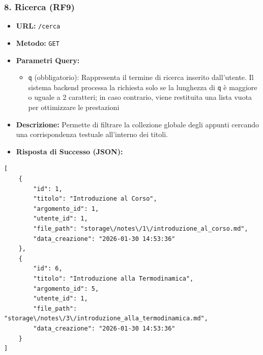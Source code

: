 \subsubsection{8. Ricerca (RF9)}
\begin{itemize}
    \item \textbf{URL:} \texttt{/cerca}
    \item \textbf{Metodo:} \texttt{GET}
    \item \textbf{Parametri Query:} 
        \begin{itemize}
            \item \texttt{q} (obbligatorio): Rappresenta il termine di ricerca inserito dall'utente. Il sistema backend processa la richiesta solo se la lunghezza di \texttt{q} è maggiore o uguale a 2 caratteri; in caso contrario, viene restituita una lista vuota per ottimizzare le prestazioni
        \end{itemize}
    \item \textbf{Descrizione:} Permette di filtrare la collezione globale degli appunti cercando una corrispondenza testuale all'interno dei titoli.
    \item \textbf{Risposta di Successo (JSON):}
\end{itemize}
\begin{verbatim}
[
    {
        "id": 1,
        "titolo": "Introduzione al Corso",
        "argomento_id": 1,
        "utente_id": 1,
        "file_path": "storage\/notes\/1\/introduzione_al_corso.md",
        "data_creazione": "2026-01-30 14:53:36"
    },
    {
        "id": 6,
        "titolo": "Introduzione alla Termodinamica",
        "argomento_id": 5,
        "utente_id": 1,
        "file_path": "storage\/notes\/3\/introduzione_alla_termodinamica.md",
        "data_creazione": "2026-01-30 14:53:36"
    }
]
\end{verbatim}

